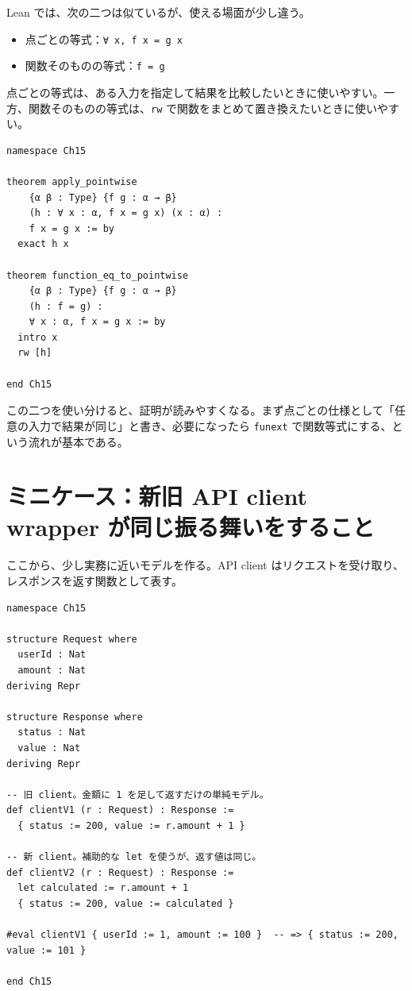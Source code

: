 Lean では、次の二つは似ているが、使える場面が少し違う。

\begin{itemize}
\item 点ごとの等式：\texttt{∀ x, f x = g x}
\item 関数そのものの等式：\texttt{f = g}
\end{itemize}

点ごとの等式は、ある入力を指定して結果を比較したいときに使いやすい。一方、関数そのものの等式は、\texttt{rw} で関数をまとめて置き換えたいときに使いやすい。

\begin{listing}[htbp]
\begin{verbatim}
namespace Ch15

theorem apply_pointwise
    {α β : Type} {f g : α → β}
    (h : ∀ x : α, f x = g x) (x : α) :
    f x = g x := by
  exact h x

theorem function_eq_to_pointwise
    {α β : Type} {f g : α → β}
    (h : f = g) :
    ∀ x : α, f x = g x := by
  intro x
  rw [h]

end Ch15
\end{verbatim}
\caption{点ごとの等式と関数等式の行き来}
\label{lst:ch15-pointwise-vs-function}
\end{listing}

この二つを使い分けると、証明が読みやすくなる。まず点ごとの仕様として「任意の入力で結果が同じ」と書き、必要になったら \texttt{funext} で関数等式にする、という流れが基本である。

\section{ミニケース：新旧 API client wrapper が同じ振る舞いをすること}

ここから、少し実務に近いモデルを作る。API client はリクエストを受け取り、レスポンスを返す関数として表す。

\begin{listing}[htbp]
\begin{verbatim}
namespace Ch15

structure Request where
  userId : Nat
  amount : Nat
deriving Repr

structure Response where
  status : Nat
  value : Nat
deriving Repr

-- 旧 client。金額に 1 を足して返すだけの単純モデル。
def clientV1 (r : Request) : Response :=
  { status := 200, value := r.amount + 1 }

-- 新 client。補助的な let を使うが、返す値は同じ。
def clientV2 (r : Request) : Response :=
  let calculated := r.amount + 1
  { status := 200, value := calculated }

#eval clientV1 { userId := 1, amount := 100 }  -- => { status := 200, value := 101 }

end Ch15
\end{verbatim}
\caption{API client の小さなモデル}
\label{lst:ch15-api-model}
\end{listing}

